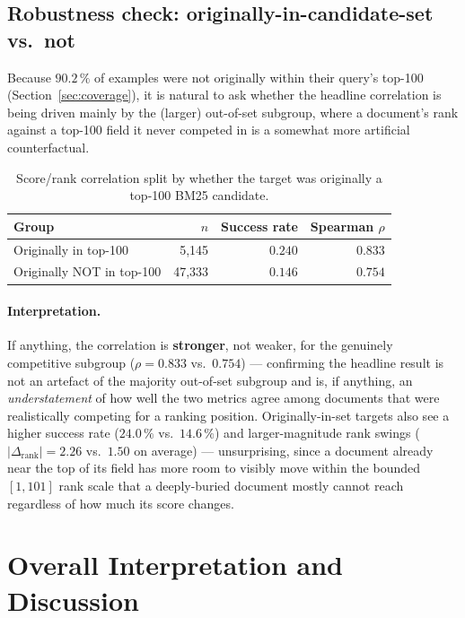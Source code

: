\documentclass[11pt]{article}
\newcommand{\rank}{\operatorname{rank}}
\begin{document}
\subsection{Robustness check: originally-in-candidate-set vs.\ not}
\label{sec:robustness}

Because $90.2\,\%$ of examples were not originally within their query's
top-100 (Section~\ref{sec:coverage}), it is natural to ask whether the
headline correlation is being driven mainly by the (larger) out-of-set
subgroup, where a document's rank against a top-100 field it never
competed in is a somewhat more artificial counterfactual.

\begin{table}[H]
\centering
\caption{Score/rank correlation split by whether the target was originally
a top-100 BM25 candidate.}
\label{tab:robustness}
\begin{tabular}{lrrr}
\toprule
Group & $n$ & Success rate & Spearman $\rho$ \\
\midrule
Originally in top-100      & 5{,}145  & $0.240$ & $0.833$ \\
Originally NOT in top-100  & 47{,}333 & $0.146$ & $0.754$ \\
\bottomrule
\end{tabular}
\end{table}

\paragraph{Interpretation.} If anything, the correlation is
\textbf{stronger}, not weaker, for the genuinely competitive subgroup
($\rho=0.833$ vs.\ $0.754$) --- confirming the headline result is not an
artefact of the majority out-of-set subgroup and is, if anything, an
\emph{understatement} of how well the two metrics agree among documents
that were realistically competing for a ranking position. Originally-in-set
targets also see a higher success rate ($24.0\,\%$ vs.\ $14.6\,\%$) and
larger-magnitude rank swings ($|\Delta_{\rank}|=2.26$ vs.\ $1.50$ on
average) --- unsurprising, since a document already near the top of its
field has more room to visibly move within the bounded $[1,101]$ rank
scale that a deeply-buried document mostly cannot reach regardless of how
much its score changes.

\section{Overall Interpretation and Discussion}
\end{document}
